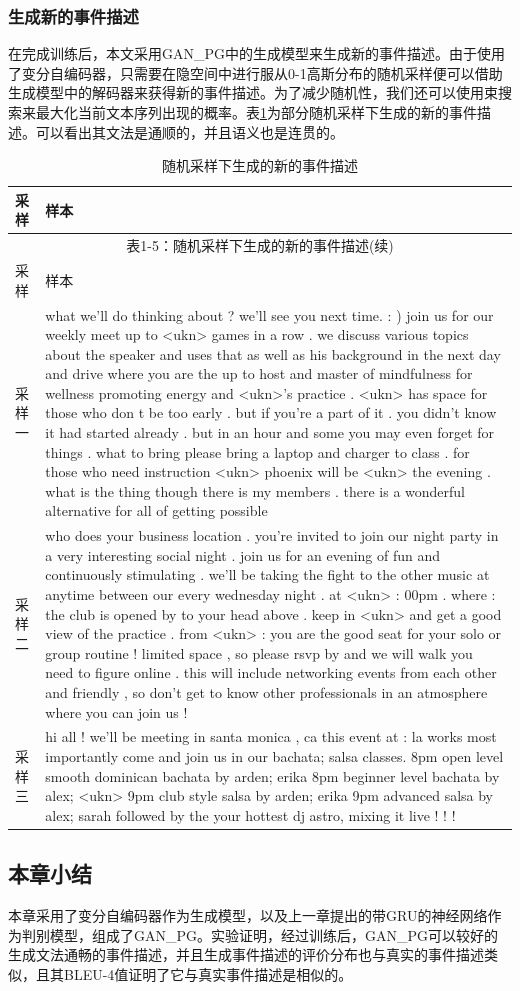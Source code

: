 \subsubsection{生成新的事件描述}
在完成训练后，本文采用GAN\_PG中的生成模型来生成新的事件描述。由于使用了变分自编码器，只需要在隐空间中进行服从0-1高斯分布的随机采样便可以借助生成模型中的解码器来获得新的事件描述。为了减少随机性，我们还可以使用束搜索来最大化当前文本序列出现的概率。表\ref{t3-4}为部分随机采样下生成的新的事件描述。可以看出其文法是通顺的，并且语义也是连贯的。
\begin{longtable}[h]{p{.1\linewidth}p{.85\linewidth}}
\caption{\label{t3-4}随机采样下生成的新的事件描述}\\
\toprule
采样&样本\\
\midrule
\endfirsthead
\multicolumn{2}{c}{表1-5：随机采样下生成的新的事件描述(续)} \\ 
\toprule
采样&样本\\
\midrule
\endhead
\bottomrule
\endfoot
\bottomrule
\endlastfoot
采样一& what we'll do thinking about ? we'll see you next time. : ) join us for our weekly meet up to <ukn> games in a row . we discuss various topics about the speaker and uses that as well as his background in the next day and drive where you are the up to host and master of mindfulness for wellness promoting energy and <ukn>'s practice . <ukn> has space for those who don t be too early . but if you're a part of it . you didn't know it had started already . but in an hour and some you may even forget for things . what to bring please bring a laptop and charger to class . for those who need instruction <ukn> phoenix will be <ukn> the evening . what is the thing though there is my members . there is a wonderful alternative for all of getting possible  \\
采样二 & who does your business location . you're invited to join our night party in a very interesting social night . join us for an evening of fun and continuously stimulating . we'll be taking the fight to the other music at anytime between our every wednesday night . at <ukn> : 00pm . where : the club is opened by to your head above . keep in <ukn> and get a good view of the practice . from <ukn> : you are the good seat for your solo or group routine ! limited space , so please rsvp by and we will walk you need to figure online . this will include networking events from each other and friendly , so don't get to know other professionals in an atmosphere where you can join us ! \\
采样三& hi all ! we'll be meeting in santa monica , ca this event at : la works most importantly come and join us in our bachata; salsa classes. 8pm open level smooth dominican bachata by arden; erika 8pm beginner level bachata by alex; <ukn> 9pm club style salsa by arden; erika 9pm advanced salsa by alex; sarah followed by the your hottest dj astro, mixing it live ! ! !\\
\end{longtable}
\subsection{本章小结}
本章采用了变分自编码器作为生成模型，以及上一章提出的带GRU的神经网络作为判别模型，组成了GAN\_PG。实验证明，经过训练后，GAN\_PG可以较好的生成文法通畅的事件描述，并且生成事件描述的评价分布也与真实的事件描述类似，且其BLEU-4值证明了它与真实事件描述是相似的。
%  
